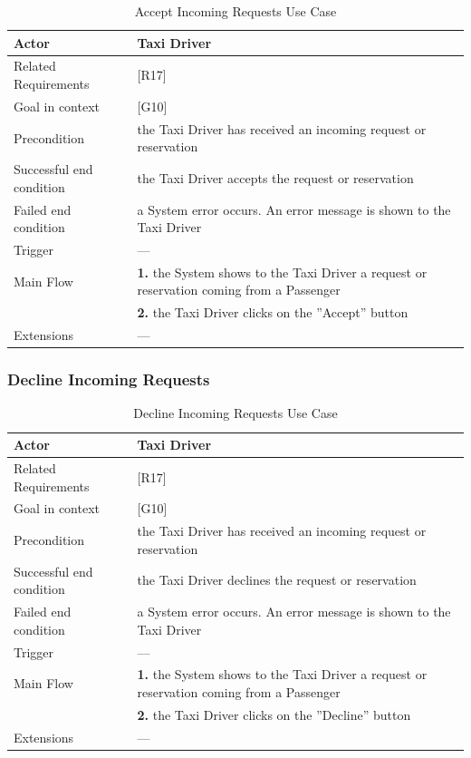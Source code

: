\begin{table}[htbp]
\begin{center}
\begin{tabular}[t]{p{}p{}}

\hline
Actor & Taxi Driver \\
\hline
Related Requirements & [R17] \\
\hline
Goal in context & [G10] \\
\hline
Precondition & the Taxi Driver has received an incoming request or reservation \\
\hline
Successful end condition & the Taxi Driver accepts the request or reservation \\
\hline
Failed end condition & a System error occurs. An error message is shown to the Taxi Driver  \\
\hline
Trigger & --- \\
\hline
Main Flow & \textbf{1.} the System shows to the Taxi Driver a request or reservation coming from a Passenger \\
& \textbf{2.} the Taxi Driver clicks on the ''Accept'' button \\
\hline
Extensions & --- \\
\hline

\end{tabular}
\end{center}
\caption{Accept Incoming Requests Use Case}
\end{table}
\clearpage

\subsubsection{Decline Incoming Requests}

\begin{table}[htbp]
\begin{center}
\begin{tabular}[t]{p{}p{}}

\hline
Actor & Taxi Driver \\
\hline
Related Requirements & [R17] \\
\hline
Goal in context & [G10] \\
\hline
Precondition & the Taxi Driver has received an incoming request or reservation \\
\hline
Successful end condition & the Taxi Driver declines the request or reservation \\
\hline
Failed end condition & a System error occurs. An error message is shown to the Taxi Driver  \\
\hline
Trigger & --- \\
\hline
Main Flow & \textbf{1.} the System shows to the Taxi Driver a request or reservation coming from a Passenger \\
& \textbf{2.} the Taxi Driver clicks on the ''Decline'' button \\
\hline
Extensions & --- \\
\hline

\end{tabular}
\end{center}
\caption{Decline Incoming Requests Use Case}
\end{table}
\clearpage

